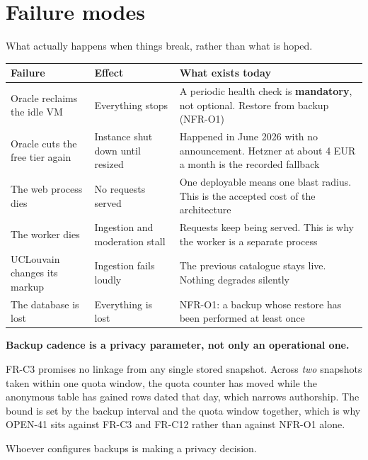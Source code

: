 \documentclass[11pt,a4paper]{article}
\begin{document}
\section{Failure modes}

What actually happens when things break, rather than what is hoped.

\begin{center}
\sffamily\small
\begin{tabular}{@{}p{4.4cm}p{4.6cm}p{5.0cm}@{}}
\toprule
\textbf{Failure} & \textbf{Effect} & \textbf{What exists today} \\
\midrule
Oracle reclaims the idle VM & Everything stops & A periodic health check is \textbf{mandatory}, not optional. Restore from backup (NFR-O1) \\[1.5mm]
Oracle cuts the free tier again & Instance shut down until resized & Happened in June 2026 with no announcement. Hetzner at about 4 EUR a month is the recorded fallback \\[1.5mm]
The web process dies & No requests served & One deployable means one blast radius. This is the accepted cost of the architecture \\[1.5mm]
The worker dies & Ingestion and moderation stall & Requests keep being served. This is why the worker is a separate process \\[1.5mm]
UCLouvain changes its markup & Ingestion fails loudly & The previous catalogue stays live. Nothing degrades silently \\[1.5mm]
The database is lost & Everything is lost & NFR-O1: a backup whose restore has been performed at least once \\
\bottomrule
\end{tabular}
\end{center}

\begin{careful}
\textbf{Backup cadence is a privacy parameter, not only an operational one.}

FR-C3 promises no linkage from any single stored snapshot. Across \emph{two}
snapshots taken within one quota window, the quota counter has moved while the
anonymous table has gained rows dated that day, which narrows authorship. The
bound is set by the backup interval and the quota window together, which is why
OPEN-41 sits against FR-C3 and FR-C12 rather than against NFR-O1 alone.

Whoever configures backups is making a privacy decision.
\end{careful}
\end{document}
